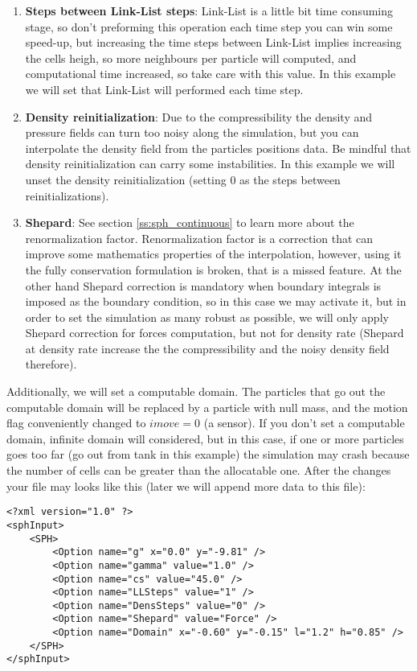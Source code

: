 \begin{enumerate}
	\item \textbf{Steps between Link-List steps}: Link-List is a little bit time consuming stage, so don't
	preforming this operation each time step you can win some speed-up, but increasing the time steps between
	Link-List implies increasing the cells heigh, so more neighbours per particle will computed, and
	computational time increased, so take care with this value. In this example we will set that Link-List will
	performed each time step.
	\item \textbf{Density reinitialization}: Due to the compressibility the density and pressure fields can turn
	too noisy along the simulation, but you can interpolate the density field from the particles positions data.
	Be mindful that density reinitialization can carry some instabilities. In this example we will unset the
	density reinitialization (setting 0 as the steps between reinitializations).
	\item \textbf{Shepard}: See section \ref{ss:sph_continuous} to learn more about the renormalization factor.
	Renormalization factor is a correction that can improve some mathematics properties of the interpolation,
	however, using it the fully conservation formulation is broken, that is a missed feature. At the other hand
	Shepard correction is mandatory when boundary integrals is imposed as the boundary condition, so in this
	case we may activate it, but in order to set the simulation as many robust as possible, we will only apply
	Shepard correction for forces computation, but not for density rate (Shepard at density rate increase the
	the compressibility and the noisy density field therefore).
\end{enumerate}
%
Additionally, we will set a computable domain. The particles that go out the computable domain will be replaced
by a particle with null mass, and the motion flag conveniently changed to $imove = 0$ (a sensor). If you don't
set a computable domain, infinite domain will considered, but in this case, if one or more particles goes too
far (go out from tank in this example) the simulation may crash because the number of cells can be greater than
the allocatable one.\rc
%
After the changes your file may looks like this (later we will append more data to this file):
%
\begin{verbatim}
<?xml version="1.0" ?>
<sphInput>
	<SPH>
		<Option name="g" x="0.0" y="-9.81" />
		<Option name="gamma" value="1.0" />
		<Option name="cs" value="45.0" />
		<Option name="LLSteps" value="1" />
		<Option name="DensSteps" value="0" />
		<Option name="Shepard" value="Force" />
		<Option name="Domain" x="-0.60" y="-0.15" l="1.2" h="0.85" />
	</SPH>
</sphInput>
\end{verbatim}
